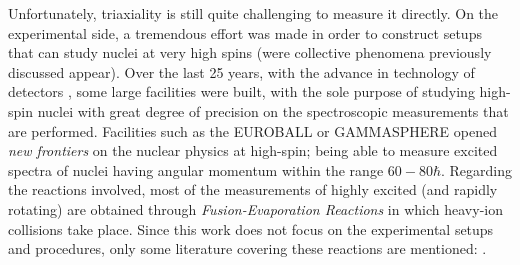 Unfortunately, triaxiality is still quite challenging to measure it directly. On the experimental side, a tremendous effort was made in order to construct setups that can study nuclei at very high spins (were collective phenomena previously discussed appear). Over the last 25 years, with the advance in technology of detectors \cite{henning2012stability}, some large facilities were built, with the sole purpose of studying high-spin nuclei with great degree of precision on the spectroscopic measurements that are performed. Facilities such as the EUROBALL \cite{simpson1997euroball} or GAMMASPHERE \cite{lee1990gammasphere} opened \emph{new frontiers} on the nuclear physics at high-spin; being able to measure excited spectra of nuclei having angular momentum within the range $60-80\hbar$. Regarding the reactions involved, most of the measurements of highly excited (and rapidly rotating) are obtained through \emph{Fusion-Evaporation Reactions} in which heavy-ion collisions take place. Since this work does not focus on the experimental setups and procedures, only some literature covering these reactions are mentioned: \cite{gu2007theoretical,henning2012stability,ayangeakaa2013exotic,matta2017exotic,lewis2019lifetime,das2018nuclear}.